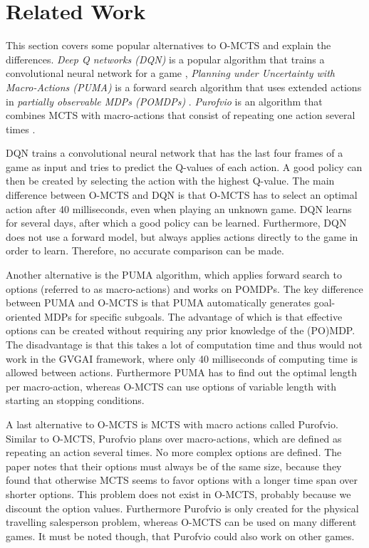 \section{Related Work}
\label{sec:related}
This section covers some popular alternatives to O-MCTS and explain the
differences. \emph{Deep Q networks (DQN)} is a popular algorithm that trains a
convolutional neural network for a game \cite{mnih2013playing}, \emph{Planning
under Uncertainty with Macro-Actions (PUMA)} is a forward search algorithm that
uses extended actions in \emph{partially observable MDPs (POMDPs)}
\cite{he2010puma}.  \emph{Purofvio} is an algorithm that combines MCTS with
macro-actions that consist of repeating one action several times
\cite{powley2012monte}.

DQN trains a convolutional neural network that has the last four frames of a
game as input and tries to predict the Q-values of each action. A good policy
can then be created by selecting the action with the highest Q-value. The main
difference between O-MCTS and DQN is that O-MCTS has to select an optimal action
after 40 milliseconds, even when playing an unknown game. DQN learns for several
days, after which a good policy can be learned.  Furthermore, DQN does not use a
forward model, but always applies actions directly to the game in order to
learn.  Therefore, no accurate comparison can be made.

Another alternative is the PUMA algorithm, which applies forward search to
options (referred to as macro-actions) and works on POMDPs. The key difference
between PUMA and O-MCTS is that PUMA automatically generates goal-oriented MDPs
for specific subgoals. The advantage of which is that effective options can be
created without requiring any prior knowledge of the (PO)MDP. The disadvantage
is that this takes a lot of computation time and thus would not work in the
GVGAI framework, where only 40 milliseconds of computing time is allowed between
actions. Furthermore PUMA has to find out the optimal length per macro-action,
whereas O-MCTS can use options of variable length with starting an stopping
conditions.

A last alternative to O-MCTS is MCTS with macro actions called Purofvio.
Similar to O-MCTS, Purofvio plans over macro-actions, which are defined as
repeating an action several times. No more complex options are defined. The
paper notes that their options must always be of the same size, because they
found that otherwise MCTS seems to favor options with a longer time span over
shorter options. This problem does not exist in O-MCTS, probably because we
discount the option values. Furthermore Purofvio is only created for the
physical travelling salesperson problem, whereas O-MCTS can be used on many
different games. It must be noted though, that Purofvio could also work on other
games.
